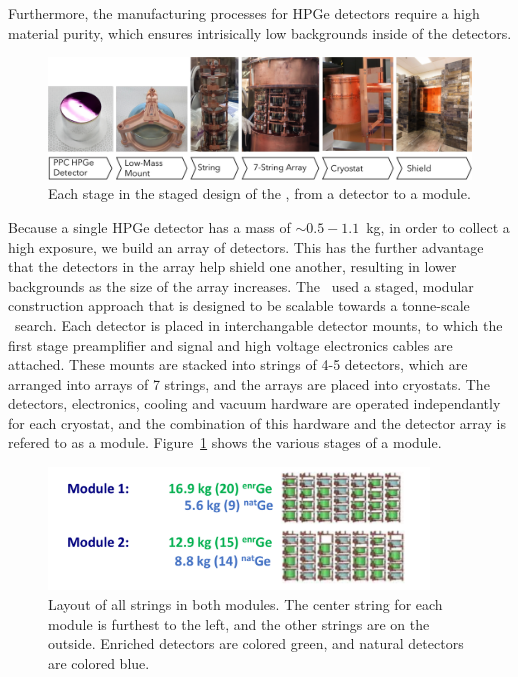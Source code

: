 \documentclass[/main.tex]{subfiles}
\begin{document}
Furthermore, the manufacturing processes for HPGe detectors require a high material purity, which ensures intrisically low backgrounds inside of the detectors.
\\
\begin{figure}[h]
  \centering
  \includegraphics[width=\textwidth]{Modular_Design}
  \caption[Modular design of the \MJD]{\label{fig:modulardesign}
    Each stage in the staged design of the \MJD, from a detector to a module.
  }
\end{figure}
Because a single HPGe detector has a mass of $\sim0.5-1.1$~kg, in order to collect a high exposure, we build an array of detectors.
This has the further advantage that the detectors in the array help shield one another, resulting in lower backgrounds as the size of the array increases.
The \MJD\ used a staged, modular construction approach that is designed to be scalable towards a tonne-scale \znbb\ search.
Each detector is placed in interchangable detector mounts, to which the first stage preamplifier and signal and high voltage electronics cables are attached.
These mounts are stacked into strings of 4-5 detectors, which are arranged into arrays of 7 strings, and the arrays are placed into cryostats.
The detectors, electronics, cooling and vacuum  hardware are operated independantly for each cryostat, and the combination of this hardware and the detector array is refered to as a module.
Figure~\ref{fig:modulardesign} shows the various stages of a module.
\\
\begin{figure}[h]
  \centering
  \includegraphics[width=0.9\textwidth]{modules}
  \caption[Layout of all strings in both modules with natural and enriched detectors labelled]{ \label{fig:modules}
    Layout of all strings in both modules. The center string for each module is furthest to the left, and the other strings are on the outside. Enriched detectors are colored green, and natural detectors are colored blue.
  }
\end{figure}
\end{document}

